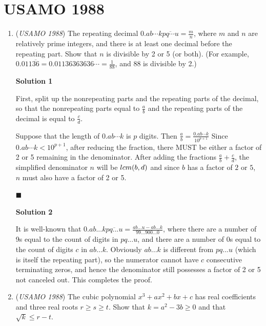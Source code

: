 \section{USAMO 1988}
        \begin{enumerate}
        	\item (\textit{USAMO 1988}) The repeating decimal $0.ab\cdots k\overline{pq\cdots u}=\frac mn$, where $m$ and $n$ are relatively prime integers, and there is at least one decimal before the repeating part. Show that $n$ is divisible by 2 or 5 (or both). (For example, $0.011\overline{36}=0.01136363636\cdots=\frac 1{88}$, and 88 is divisible by 2.)


 



\textbf{Solution 1}

First, split up the nonrepeating parts and the repeating parts of the decimal, so that the nonrepeating parts equal to $\frac{a}{b}$ and the repeating parts of the decimal is equal to $\frac{c}{d}$.

 Suppose that the length of  $0.ab\cdots k$ is $p$ digits. Then $\frac{a}{b} = \frac{0.ab\cdots k}{10^{p+1}}$ Since $0.ab\cdots k < 10^{p+1}$, after reducing the fraction, there MUST be either a factor of 2 or 5 remaining in the denominator. After adding the fractions $\frac{a}{b}+\frac{c}{d}$, the simplified denominator $n$ will be $\\lcm(b,d)$ and since $b$ has a factor of $2$ or $5$,  $n$ must also have a factor of 2 or 5.

 $\blacksquare$




\textbf{Solution 2}

It is well-known that $0.ab...k \overline{pq...u} = \frac{ab...u - ab...k}{99...900...0}$, where there are a number of 9s equal to the count of digits in $pq...u$, and there are a number of 0s equal to the count of digits $c$ in $ab...k$. Obviously $ab...k$ is different from $pq...u$ (which is itself the repeating part), so the numerator cannot have $c$ consecutive terminating zeros, and hence the denominator still possesses a factor of 2 or 5 not canceled out. This completes the proof.

 


	\item (\textit{USAMO 1988}) The cubic polynomial $x^3+ax^2+bx+c$ has real coefficients and three real roots $r\ge s\ge t$. Show that $k=a^2-3b\ge 0$ and that $\sqrt k\le r-t$.



\end{enumerate}
